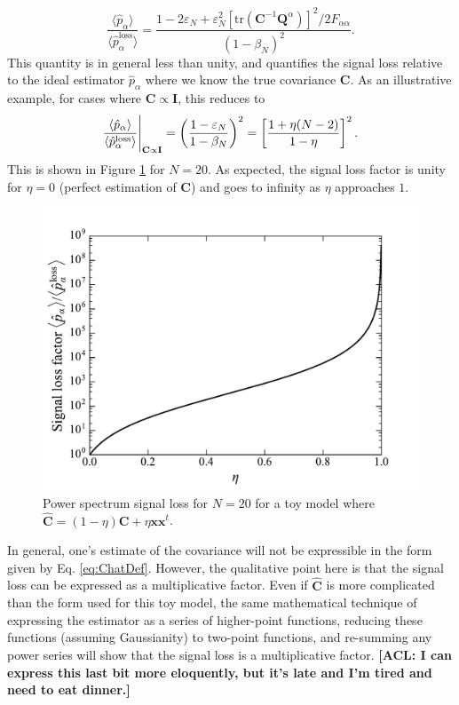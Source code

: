 \documentclass[preprint2,numberedappendix,tighten]{aastex6}  %
\newcommand{\x}{\mathbf{x}}
\newcommand{\C}{\mathbf{C}}
\newcommand{\Chat}{\mathbf{\hat{C}}}
\newcommand{\Q}{\mathbf{Q}}
\newcommand{\I}{\mathbf{I}}
\newcommand{\acl}[1]{{\color{red} \textbf{[ACL:  #1]}}}
\begin{document}
\begin{equation}
\frac{\langle \hat{p}_\alpha \rangle}{\langle \hat{p}_\alpha^\textrm{loss} \rangle} = \frac{1- 2\varepsilon_N + \varepsilon_N^2 \left[ \textrm{tr} (\C^{-1} \Q^\alpha) \right]^2 / 2F_{\alpha \alpha}}{(1-\beta_N)^2}.
\end{equation}
This quantity is in general less than unity, and quantifies the signal loss relative to the ideal estimator $\hat{p}_\alpha$ where we know the true covariance $\C$. As an illustrative example, for cases where $\C \propto \I$, this reduces to
\begin{equation}
\frac{\langle \hat{p}_\alpha \rangle}{\langle \hat{p}_\alpha^\textrm{loss} \rangle}  \Bigg{|}_{\C \propto \I} = \left( \frac{1-\varepsilon_N}{1-\beta_N} \right)^2 = \left[\frac{1+ \eta(N-2)}{1- \eta}\right]^2.
\end{equation}
This is shown in Figure \ref{fig:analytic_sig_loss} for $N=20$. As expected, the signal loss factor is unity for $\eta=0$ (perfect estimation of $\C$) and goes to infinity as $\eta$ approaches $1$.
\begin{figure}
	\centering
	\includegraphics[width=0.6\columnwidth]{plots/analytic_sig_loss.pdf}
	\caption{Power spectrum signal loss for $N=20$ for a toy model where $\Chat = (1-\eta) \C + \eta \x \x^t$.}
	\label{fig:analytic_sig_loss}
\end{figure}

In general, one's estimate of the covariance will not be expressible in the form given by Eq. \eqref{eq:ChatDef}. However, the qualitative point here is that the signal loss can be expressed as a multiplicative factor. Even if $\Chat$ is more complicated than the form used for this toy model, the same mathematical technique of expressing the estimator as a series of higher-point functions, reducing these functions (assuming Gaussianity) to two-point functions, and re-summing any power series will show that the signal loss is a multiplicative factor. \acl{I can express this last bit more eloquently, but it's late and I'm tired and need to eat dinner.}




\end{document}
